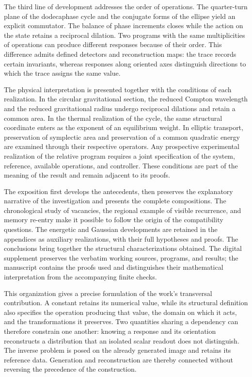 The third line of development addresses the order of operations. The
quarter-turn plane of the dodecaphase cycle and the conjugate forms of the
ellipse yield an explicit commutator. The balance of phase increments
closes while the action on the state retains a reciprocal dilation. Two
programs with the same multiplicities of operations can produce different
responses because of their order. This difference admits defined
detectors and reconstruction maps: the trace records certain invariants,
whereas responses along oriented axes distinguish directions to which the
trace assigns the same value.

The physical interpretation is presented together with the conditions of
each realization. In the circular gravitational section, the reduced
Compton wavelength and the reduced gravitational radius undergo
reciprocal dilations and retain a common area. In the thermal realization
of the cycle, the same structural coordinate enters as the exponent of an
equilibrium weight. In elliptic transport, preservation of symplectic area
and preservation of a common quadratic energy are examined through their
respective operators. Any prospective experimental realization of the relative
program requires a joint specification of the system, reference,
available operations, and controller. These conditions are part of the
meaning of the result and remain adjacent to its proofs.

The exposition first develops the antecedents, then preserves the
explanatory narrative of the investigation and presents the complete
compositions. The chronological study of vacancies, the regional example
of visible recurrence, and memory re-entry make it possible to follow the
origin of the compatibility questions. The energetic and Gaussian
developments are retained in the appendices as auxiliary realizations,
with their full hypotheses and proofs. The conclusions bring together
the structural characterizations obtained. The digital supplement
preserves the verbatim working sources, programs, and results; the
manuscript contains the proofs used and distinguishes their mathematical
interpretation from the accompanying finite checks.

This organization gives a precise formulation of the work's transversal
contribution. A constant retains its numerical value, while its structural
definition also specifies the operation producing that value, the domain
on which it acts, and the transformations it preserves. Two quantities
sharing a dependency can therefore constrain one another: knowing a
response and its orientation reconstructs a distribution that an isolated
scalar readout does not distinguish. The inverse problem is posed on the
already generated image and retains its reference data. Generation and
reconstruction are thereby connected without reversing the precedence of
the construction.

